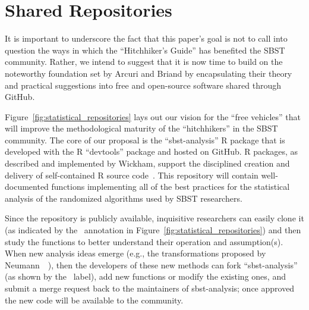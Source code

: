 
\vspace*{-.5em}

\section{Shared Repositories}
\label{sec:repositories}



It is important to underscore the fact that this paper's goal is not to call into question the ways in which the
``Hitchhiker's Guide'' has benefited the SBST community. Rather, we intend to suggest that it is now time to build on
the noteworthy foundation set by Arcuri and Briand by encapsulating their theory and practical suggestions into free and
open-source software shared through GitHub.

Figure~\ref{fig:statistical_repositories} lays out our vision for the ``free vehicles'' that will improve the
methodological maturity of the ``hitchhikers'' in the SBST community. The core of our proposal is the ``sbst-analysis''
R package that is developed with the R ``devtools'' package and hosted on GitHub. R packages, as described and
implemented by Wickham, support the disciplined creation and delivery of self-contained R source
code~\cite{Wickham2015}. This repository will contain well-documented functions implementing all of the best practices
for the statistical analysis of the randomized algorithms used by SBST researchers.

Since the repository is publicly available, inquisitive researchers can easily clone it (as indicated by the
\codecopygit~annotation in Figure~\ref{fig:statistical_repositories}) and then study the functions to better understand
their operation and assumption(s). When new analysis ideas emerge (e.g., the transformations proposed by
Neumann~\etal~\cite{Neumann2015}), then the developers of these new methods can fork ``sbst-analysis'' (as shown by the
\codeforkgit~label), add new functions or modify the existing ones, and submit a merge request back to the maintainers
of sbst-analysis; once approved the new code will be available to the community.

